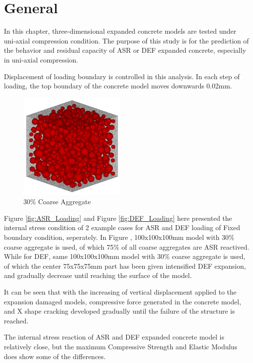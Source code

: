 

\section{General}

In this chapter, three-dimensional expanded concrete models are tested under uni-axial compression condition. The purpose of this study is for the prediction of the behavior and residual capacity of ASR or DEF expanded concrete, especially in uni-axial compression.

Displacement of loading boundary is controlled in this analysis. In each step of loading, the top boundary of the concrete model moves downwards 0.02mm.

\begin{figure}[ht]
\centering
\includegraphics[width=.3\linewidth]{Files/Aggregate/A30.png}
  \caption{30\% Coarse Aggregate}
  \label{fig:A30_model}
\end{figure}

Figure \ref{fig:ASR_Loading} and Figure \ref{fig:DEF_Loading} here presented the internal stress condition of 2 example cases for ASR and DEF loading of Fixed boundary condition, seperately. In Figure , 100x100x100mm model with 30\% coarse aggregate is used, of which 75\% of all coarse aggregates are ASR reactived. While for DEF, same 100x100x100mm model with 30\% coarse aggregate is used, of which the center 75x75x75mm part has been given intensified DEF expansion, and gradually decrease until reaching the surface of the model.

It can be seen that with the increasing of vertical displacement applied to the expansion damaged models, compressive force generated in the concrete model,  and X shape cracking developed gradually until the failure of the structure is reached.

The internal stress reaction of ASR and DEF expanded concrete model is relatively close, but the maximum Compressive Strength and Elastic Modulus does show some of the differences.

